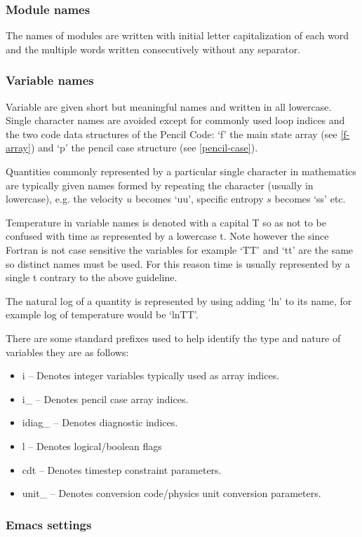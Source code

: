 \documentclass[\mydriver,12pt,twoside,notitlepage,a4paper]{article}
\begin{document}
\subsubsection{Module names}
The names of modules are written with initial letter capitalization
of each word and the multiple words written consecutively without
any separator.

\subsubsection{Variable names}
Variable are given short but meaningful names and written
in all lowercase.  Single character names are avoided except
for commonly used loop indices and the two code data structures
of the {\sc Pencil Code}: `f' the main state array (see \ref{f-array}) and `p' the pencil case
structure (see \ref{pencil-case}).

Quantities commonly represented by a particular single character
in mathematics are typically given names formed by repeating the
character (usually in lowercase), e.g. the velocity $u$ becomes `uu',
specific entropy $s$ becomes `ss' etc.

Temperature in variable names is denoted with a capital T so as not to
be confused with time as represented by a lowercase t.  Note however the
since Fortran is not case sensitive the variables for example `TT' and
`tt' are the same so distinct names must be used. For this reason time is
usually represented by a single t contrary to the above guideline.

The natural log of a quantity is represented by using adding `ln' to its
name, for example log of temperature would be `lnTT'.

There are some standard prefixes used to help identify the type and nature
of variables they are as follows:
\begin{itemize}
\item i -- Denotes integer variables typically used as array indices.
\item i_ -- Denotes pencil case array indices.
\item idiag_ -- Denotes diagnostic indices.
\item l -- Denotes logical/boolean flags
\item cdt -- Denotes timestep constraint parameters.
\item unit_ -- Denotes conversion code/physics unit conversion parameters.
\end{itemize}

\subsubsection{Emacs settings}
\end{document}
